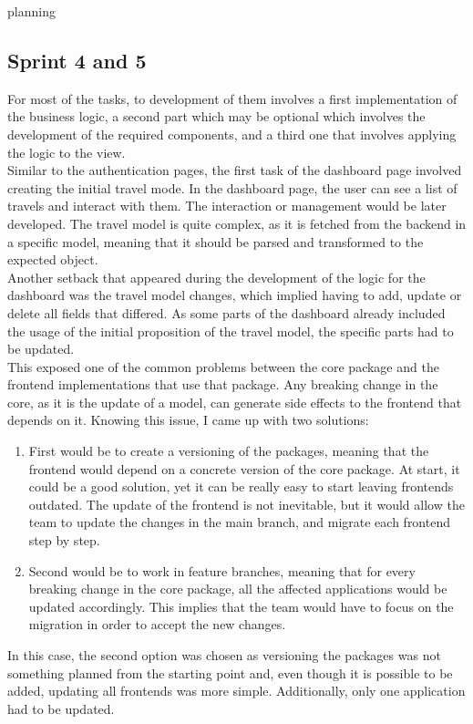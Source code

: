 planning\documentclass[../memory.tex]{subfiles}
\begin{document}
\subsection{Sprint 4 and 5}
For most of the tasks, to development of them involves a first implementation of
the business logic, a second part which may be optional which involves the
development of the required components, and a third one that involves applying
the logic to the view.
\\[8pt]
Similar to the authentication pages, the first task of the dashboard page
involved creating the initial travel mode. In the dashboard page, the user can
see a list of travels and interact with them. The interaction or management
would be later developed. The travel model is quite complex, as it is
fetched from the backend in a specific model, meaning that it should be parsed
and transformed to the expected object.
\\
Another setback that appeared during the development of the logic for the
dashboard was the travel model changes, which implied having to add, update or
delete all fields that differed. As some parts of the dashboard already included
the usage of the initial proposition of the travel model, the specific parts had
to be updated.
\\[8pt]
This exposed one of the common problems between the core package and the
frontend implementations that use that package. Any breaking change in the core,
as it is the update of a model, can generate side effects to the frontend that
depends on it. Knowing this issue, I came up with two solutions:
\begin{enumerate}
	\item First would be to create a versioning of the packages, meaning that the
	      frontend would depend on a concrete version of the core package. At
	      start, it could be a good solution, yet it can be really easy to start
	      leaving frontends outdated. The update of the frontend is not
	      inevitable, but it would allow the team to update the changes in the
	      main branch, and migrate each frontend step by step.
	\item Second would be to work in feature branches, meaning that for every
	      breaking change in the core package, all the affected applications would be
	      updated accordingly. This implies that the team would have to focus on the
	      migration in order to accept the new changes.
\end{enumerate}
In this case, the second option was chosen as versioning the packages was not
something planned from the starting point and, even though it is possible to be
added, updating all frontends was more simple. Additionally, only one
application had to be updated.
\end{document}
